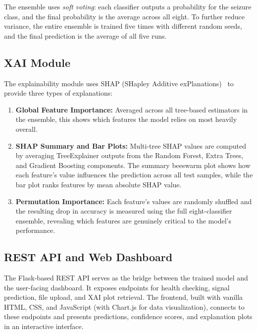 The ensemble uses \textit{soft voting}: each classifier outputs a probability for the seizure class, and the final probability is the average across all eight. To further reduce variance, the entire ensemble is trained five times with different random seeds, and the final prediction is the average of all five runs.

\subsection{XAI Module}

The explainability module uses SHAP (SHapley Additive exPlanations)~\citep{lundberg2017unified} to provide three types of explanations:

\begin{enumerate}
    \item \textbf{Global Feature Importance:} Averaged across all tree-based estimators in the ensemble, this shows which features the model relies on most heavily overall.

    \item \textbf{SHAP Summary and Bar Plots:} Multi-tree SHAP values are computed by averaging TreeExplainer outputs from the Random Forest, Extra Trees, and Gradient Boosting components. The summary beeswarm plot shows how each feature's value influences the prediction across all test samples, while the bar plot ranks features by mean absolute SHAP value.

    \item \textbf{Permutation Importance:} Each feature's values are randomly shuffled and the resulting drop in accuracy is measured using the full eight-classifier ensemble, revealing which features are genuinely critical to the model's performance.
\end{enumerate}

\subsection{REST API and Web Dashboard}

The Flask-based REST API serves as the bridge between the trained model and the user-facing dashboard. It exposes endpoints for health checking, signal prediction, file upload, and XAI plot retrieval. The frontend, built with vanilla HTML, CSS, and JavaScript (with Chart.js for data visualization), connects to these endpoints and presents predictions, confidence scores, and explanation plots in an interactive interface.

